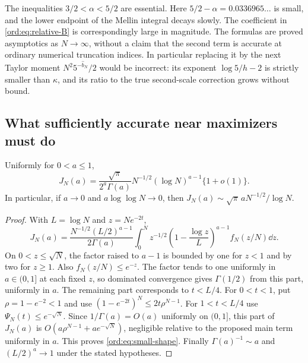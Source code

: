 \begin{remark}\label{ord:rem:late}
The inequalities $3/2<\alpha<5/2$ are essential. Here
$5/2-\alpha=0.0336965\ldots$ is small, and the lower endpoint of the
Mellin integral decays slowly. The coefficient in
\eqref{ord:eq:relative-B} is correspondingly large in magnitude.
The formulas are proved asymptotics as $N\to\infty$, without a claim
that the second term is accurate at ordinary numerical truncation
indices. In particular replacing it by the next Taylor moment
$N^2 5^{-\widehat b_N}/2$ would be incorrect: its exponent
$\log5/h-2$ is strictly smaller than $\kappa$, and its ratio to the
true second-scale correction grows without bound.
\end{remark}

\subsection{What sufficiently accurate near maximizers must do}

\begin{lemma}\label{ord:lem:small-shape}
Uniformly for $0<a\le1$,
\begin{equation}\label{ord:eq:small-shape}
 J_N(a)=\frac{\sqrt\pi}{2^a\Gamma(a)}
              N^{-1/2}(\log N)^{a-1}\{1+o(1)\}.
\end{equation}
In particular, if $a\to0$ and $a\log\log N\to0$, then
$J_N(a)\sim\sqrt\pi\,aN^{-1/2}/\log N$.
\end{lemma}
\begin{proof}
With $L=\log N$ and $z=Ne^{-2t}$,
\[
 J_N(a)=\frac{N^{-1/2}(L/2)^{a-1}}{2\Gamma(a)}
 \int_0^N z^{-1/2}
   \left(1-\frac{\log z}L\right)^{a-1}f_N(z/N)\dd z.
\]
On $0<z\le\sqrt N$, the factor raised to $a-1$ is bounded by one
for $z<1$ and by two for $z\ge1$. Also $f_N(z/N)\le e^{-z}$.
The factor tends to one uniformly in $a\in(0,1]$ at each fixed $z$,
so dominated convergence gives $\Gamma(1/2)$ from this part, uniformly
in $a$.
The remaining part corresponds to $t<L/4$. For $0<t<1$, put
$\rho=1-e^{-2}<1$ and use
$(1-e^{-2t})^N\le2t\rho^{N-1}$. For $1<t<L/4$ use
$\Psi_N(t)\le e^{-\sqrt N}$. Since $1/\Gamma(a)=O(a)$ uniformly on
$(0,1]$, this part of $J_N(a)$ is
$O(a\rho^{N-1}+ae^{-\sqrt N})$, negligible relative to the proposed
main term uniformly in $a$. This proves \eqref{ord:eq:small-shape}.
Finally $\Gamma(a)^{-1}\sim a$ and
$(L/2)^a\to1$ under the stated hypotheses.
\end{proof}

